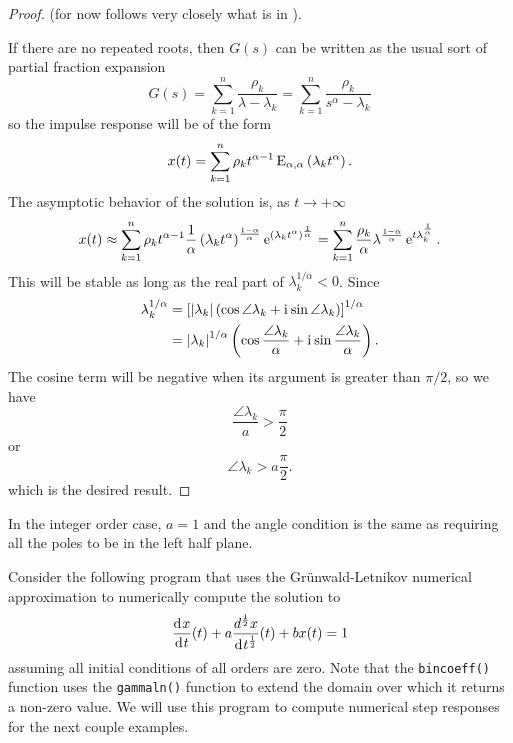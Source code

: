 \begin{proof}
  (for now follows very closely what is in \cite{fraccontrol}).

  If there are no repeated roots, then $G(s)$ can be written as the usual sort of partial fraction expansion
  \begin{equation*}
    G(s) = \sum_{k=1}^n \frac{\rho_k}{\lambda - \lambda_k} =  \sum_{k=1}^n \frac{\rho_k}{s^\alpha - \lambda_k}
  \end{equation*}
  so the impulse response will be of the form
  \begin{equation*}
    x(t) = \sum_{k=1}^n \rho_k t^{\alpha-1} \operatorname{E}_{\alpha,\alpha} \left( \lambda_k t^\alpha \right).
  \end{equation*}
  The asymptotic behavior of the solution is, as $t \rightarrow +\infty$
  \begin{equation*}
    x(t) \approx \sum_{k=1}^n \rho_k t^{\alpha-1} \frac{1}{\alpha} \left( \lambda_k t^\alpha \right)^\frac{1-\alpha}{\alpha} \operatorname{e}^{\left( \lambda_k t^\alpha \right)^\frac{1}{\alpha}} = \sum_{k=1}^n \frac{\rho_k}{\alpha}\lambda^{\frac{1-\alpha}{\alpha}}\operatorname{e}^{t \lambda_k^\frac{1}{\alpha}}.
  \end{equation*}
  This will be stable as long as the real part of $\lambda_k^{1/\alpha} < 0$. Since
  \begin{align*}
    \lambda_k^{1/\alpha} &= \left[ \left| \lambda_k \right| \left( \cos \angle \lambda_k + \mathrm{i}\mkern1mu \sin \angle \lambda_k \right) \right]^{1/\alpha} \\
    &= \left| \lambda_k \right|^{1/\alpha} \left( \cos \frac{\angle \lambda_k}{\alpha} + \mathrm{i}\mkern1mu \sin \frac{\angle \lambda_k}{\alpha} \right).
  \end{align*}
  The cosine term will be negative when its argument is greater than $\pi/2$, so we have
  \begin{equation*}
    \frac{\angle \lambda_k}{a} > \frac{\pi}{2}
  \end{equation*}
  or
  \begin{equation*}
    \angle \lambda_k > a \frac{\pi}{2}.
  \end{equation*}
  which is the desired result.
\end{proof}

\begin{remark}
  In the integer order case, $a = 1$ and the angle condition is the same as requiring all the poles to be in the left half plane.
\end{remark}

Consider the following program that uses the Gr\"unwald-Letnikov numerical approximation to numerically compute the solution to
\begin{equation*}
  \frac{\operatorname{d}\hspace*{-1pt} x}{\operatorname{d}\hspace*{-1pt} t}(t) + a \frac{d^\frac{1}{2} x}{\operatorname{d}\hspace*{-1pt} t^\frac{1}{2}}(t) + b x(t) = 1
\end{equation*}
assuming all initial conditions of all orders are zero. Note that the \texttt{bincoeff()} function uses the \texttt{gammaln()} function to extend the domain over which it returns a non-zero value. We will use this program to compute numerical step responses for the next couple examples.
\lstset{numbers=left, numberstyle=\tiny, stepnumber=1, numbersep=5pt}


